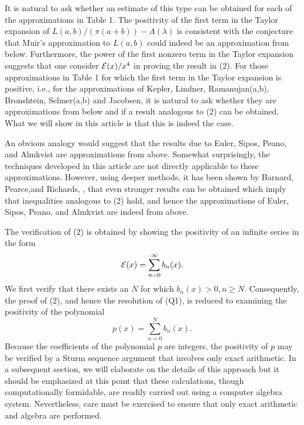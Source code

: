 \documentclass[12pt]{article}
\begin{document}
It is natural to ask whether an estimate of this type  can be obtained 
for each
of the approximations in Table 1. The positivity of the first term in the 
Taylor expansion  of
$L(a,b)/ (\pi (a+b) ) - A(\lambda)$ is consistent with the conjecture 
that Muir's approximation
to $L(a,b)$ could indeed be an approximation from below. Furthermore, the 
power of the first
nonzero term in the Taylor expansion suggests that one consider ${\cal 
E}(x)/ x^4$ in proving the 
result in (2).   For those approximations in Table 1 for which the first 
term in the Taylor expansion
is positive, i.e., for the  approximations of Kepler, Lindner, 
Ramanujan(a,b), Bronshtein, Selmer(a,b)
and Jacobsen, it is natural to ask whether they  are approximations from 
below and if a result
analogous to (2) can be obtained. What we will show in this article  is 
that this is indeed the case. 

An obvious analogy would suggest that the results due to Euler, Sipos, 
Peano,  and Almkvist
are approximations from above.  Somewhat surprisingly, the techniques 
developed in this article are not
directly applicable to these approximations.  However, using  deeper 
methods, it has been
shown  by Barnard, Pearce,and Richards, \cite{KD}, that even stronger 
results can be obtained which
imply that  inequalities analogous to (2) hold, and hence the 
approximations of Euler, Sipos, Peano, 
and Almkvist are indeed from above.

The verification of (2) is obtained by showing the positivity of an 
infinite series in the form 
$$ 
{\cal E}(x)=\sum_{n=0}^{\infty}  b_n(x). 
$$
We first verify that there exists an $N$ for which $b_n(x)>0, n\geq N$. 
Consequently, the proof of
(2), and hence the resolution of (Q1), is reduced  to examining the 
positivity of the polynomial 
$$  
p(x)=\sum_{n=0}^{N}  b_n(x). 
$$  
Because the coefficients of the polynomial $p$ are integers, the 
positivity of $p$ may be verified
by a Sturm sequence argument that involves only exact arithmetic.  In a 
subsequent section, we will
elaborate on the details of this approach but it should be emphasized at 
this point that  these 
calculations, though computationally formidable, are readily carried out 
using a computer algebra
system.  Nevertheless, care must be exercised to ensure that only  exact 
arithmetic and algebra are
performed. 

\vspace{18pt} 
\vspace{12pt} 
\end{document}
